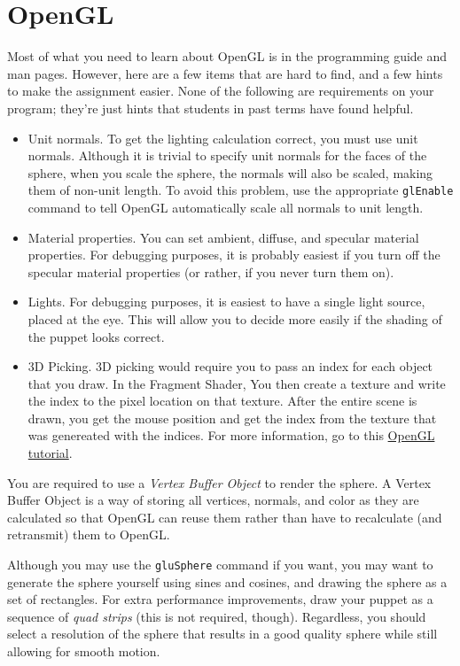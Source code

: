 \section{OpenGL}
Most of what you need to learn about OpenGL is in the programming
guide and man pages.  However, here are a few items that are
hard to find, and a few hints to make the assignment easier.
None of the following are requirements on your program; they're
just hints that students in past terms have found helpful.
\begin{itemize}
	\item Unit normals.  To get the lighting calculation
		correct, you must use unit normals.  Although
		it is trivial to specify unit normals for the
		faces of the sphere, when you scale the sphere,
		the normals will also be scaled, making them
		of non-unit length.  To avoid this problem,
		use the appropriate {\tt glEnable} command to tell OpenGL
		automatically scale all normals to unit length.
	\item Material properties.  You can set ambient, diffuse,
		and specular material properties.  For debugging
		purposes, it is probably easiest if you turn off
		the specular material properties (or rather, if
		you never turn them on).
	\item Lights.  For debugging purposes, it is easiest to
		have a single light source, placed at the eye.
		This will allow you to decide more easily if
		the shading of the puppet looks correct.
        \item 3D Picking. 3D picking would require you to pass an index for each
                object that you draw. In the Fragment Shader, You then create a
                texture and write the index to the pixel location on that
                texture. After the entire scene is drawn, you get the mouse
                position and get the index from the texture that was genereated
                with the indices. 
                For more information, go to this
                \href{http://www.opengl-tutorial.org/miscellaneous/clicking-on-objects/picking-with-an-opengl-hack/}{OpenGL tutorial}.
\end{itemize}

You are required to use a {\em Vertex Buffer Object} to render the sphere. A
Vertex Buffer Object is a way of storing all vertices, normals, and color as
they are calculated so that OpenGL can reuse them rather than have to
recalculate (and retransmit) them to OpenGL. 

Although you may use the {\tt gluSphere} command if you want, you may
want to generate the sphere yourself using sines and
cosines, and drawing the sphere as a set of rectangles.  For extra
performance improvements, draw your puppet as a sequence of {\em quad
strips} (this is not required, though).  Regardless, you should select
a resolution of the sphere that results in a good quality sphere while
still allowing for smooth motion.

